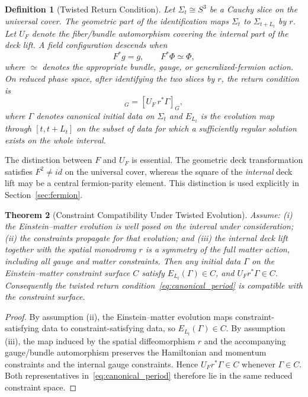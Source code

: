 \documentclass[11pt]{article}
\theoremstyle{canonmath}
\newtheorem{theorem}{Theorem}[section]
\newtheorem{definition}[theorem]{Definition}
\theoremstyle{canonpostulate}
\theoremstyle{canonclaim}
\providecommand{\Sthree}{S^3}
\providecommand{\id}{\mathrm{id}}
\def\mathrm#1{#1}%
\def\mathcal#1{#1}%
\begin{document}
\begin{definition}[Twisted Return Condition] \label{def:twisted}
Let $\Sigma_t\cong\Sthree$ be a Cauchy slice on the universal cover. The geometric part of the identification maps $\Sigma_t$ to $\Sigma_{t+L_t}$ by $r$. Let $U_F$ denote the fiber/bundle automorphism covering the internal part of the deck lift. A field configuration descends when
\begin{equation}
F^*g=g,
\qquad
F^*\Phi\simeq\Phi,
\end{equation}
where $\simeq$ denotes the appropriate bundle, gauge, or generalized-fermion action. On reduced phase space, after identifying the two slices by $r$, the return condition is
\begin{equation}
[\mathcal E_{L_t}(\Gamma)]_{\mathcal G}
=
[U_F\,r^*\Gamma]_{\mathcal G},
\label{eq:canonical_period}
\end{equation}
where $\Gamma$ denotes canonical initial data on $\Sigma_t$ and $\mathcal E_{L_t}$ is the evolution map through $[t,t+L_t]$ on the subset of data for which a sufficiently regular solution exists on the whole interval.
\end{definition}

The distinction between $F$ and $U_F$ is essential. The geometric deck transformation satisfies $F^2\neq\id$ on the universal cover, whereas the square of the \emph{internal} deck lift may be a central fermion-parity element. This distinction is used explicitly in Section~\ref{sec:fermion}.

\begin{theorem}[Constraint Compatibility Under Twisted Evolution] \label{thm:constraints}
Assume: (i) the Einstein--matter evolution is well posed on the interval under consideration; (ii) the constraints propagate for that evolution; and (iii) the internal deck lift together with the spatial monodromy $r$ is a symmetry of the full matter action, including all gauge and matter constraints. Then any initial data $\Gamma$ on the Einstein--matter constraint surface $\mathcal C$ satisfy $\mathcal E_{L_t}(\Gamma)\in\mathcal C$, and $U_F r^*\Gamma\in\mathcal C$. Consequently the twisted return condition~\eqref{eq:canonical_period} is compatible with the constraint surface.
\end{theorem}
\begin{proof}
By assumption (ii), the Einstein--matter evolution maps constraint-satisfying data to constraint-satisfying data, so $\mathcal E_{L_t}(\Gamma)\in\mathcal C$. By assumption (iii), the map induced by the spatial diffeomorphism $r$ and the accompanying gauge/bundle automorphism preserves the Hamiltonian and momentum constraints and the internal gauge constraints. Hence $U_F r^*\Gamma\in\mathcal C$ whenever $\Gamma\in\mathcal C$. Both representatives in~\eqref{eq:canonical_period} therefore lie in the same reduced constraint space.
\end{proof}
\end{document}
